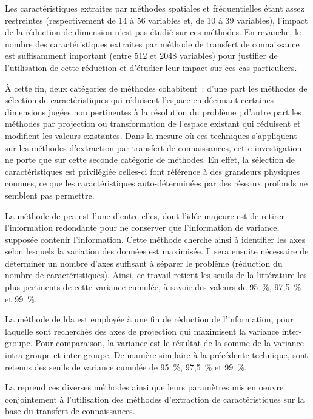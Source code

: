 Les caractéristiques extraites par méthodes spatiales et fréquentielles étant assez restreintes (respectivement de 14 à 56 variables et, de 10 à 39 variables), l'impact de la réduction de dimension n'est pas étudié sur ces méthodes. En revanche, le nombre des caractéristiques extraites par méthode de transfert de connaissance est suffisamment important (entre 512 et 2048 variables) pour justifier de l'utilisation de cette réduction et d'étudier leur impact sur ces cas particuliers.\par

À cette fin, deux catégories de méthodes cohabitent~: d'une part les méthodes de sélection de caractéristiques qui réduisent l'espace en décimant certaines dimensions jugées non pertinentes à la résolution du problème ; d'autre part les méthodes par projection ou transformation de l'espace existant qui réduisent et modifient les valeurs existantes. Dans la mesure où ces techniques s'appliquent sur les méthodes d'extraction par transfert de connaissances, cette investigation ne porte que sur cette seconde catégorie de méthodes. En effet, la sélection de caractéristiques est privilégiée celles-ci font référence à des grandeurs physiques connues, ce que les caractéristiques auto-déterminées par des réseaux profonds ne semblent pas permettre.\par

La méthode de \gls{pca} est l'une d'entre elles, dont l'idée majeure est de retirer l'information redondante pour ne conserver que l'information de variance, supposée contenir l'information. Cette méthode cherche ainsi à identifier les axes selon lesquels la variation des données est maximisée. Il sera ensuite nécessaire de déterminer un nombre d'axes suffisant à séparer le problème (réduction du nombre de caractéristiques). Ainsi, ce travail retient les seuils de la littérature les plus pertinents de cette variance cumulée, à savoir des valeurs de 95~\%, 97,5~\% et 99~\%.\par

La méthode de \gls{lda} est employée à une fin de réduction de l'information, pour laquelle sont recherchés des axes de projection qui maximisent la variance inter-groupe. Pour comparaison, la variance est le résultat de la somme de la variance intra-groupe et inter-groupe. De manière similaire à la précédente technique, sont retenus des seuils de variance cumulée de 95~\%, 97,5~\% et 99~\%.\par

La  reprend ces diverses méthodes ainsi que leurs paramètres mis en oeuvre conjointement à l'utilisation des méthodes d'extraction de caractéristiques sur la base du transfert de connaissances.\par 

